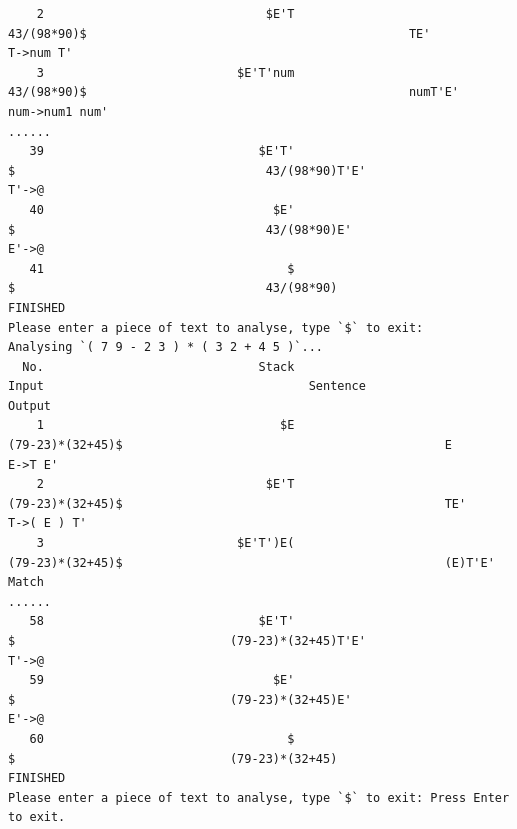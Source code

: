 \documentclass[UTF8]{ctexart}
\begin{document}
\begin{lstlisting}
    2                               $E'T                                  43/(98*90)$                                             TE'                        T->num T'
    3                           $E'T'num                                  43/(98*90)$                                             numT'E'                      num->num1 num'
......
   39                              $E'T'                                            $                                   43/(98*90)T'E'                       T'->@
   40                                $E'                                            $                                   43/(98*90)E'                       E'->@
   41                                  $                                            $                                   43/(98*90)                 FINISHED
Please enter a piece of text to analyse, type `$` to exit:
Analysing `( 7 9 - 2 3 ) * ( 3 2 + 4 5 )`...
  No.                              Stack                                        Input                                     Sentence                   Output
    1                                 $E                             (79-23)*(32+45)$                                             E                        E->T E'
    2                               $E'T                             (79-23)*(32+45)$                                             TE'                        T->( E ) T'
    3                           $E'T')E(                             (79-23)*(32+45)$                                             (E)T'E'                    Match
......
   58                              $E'T'                                            $                              (79-23)*(32+45)T'E'                       T'->@
   59                                $E'                                            $                              (79-23)*(32+45)E'                       E'->@
   60                                  $                                            $                              (79-23)*(32+45)                 FINISHED
Please enter a piece of text to analyse, type `$` to exit: Press Enter to exit.
    \end{lstlisting}
\end{document}
